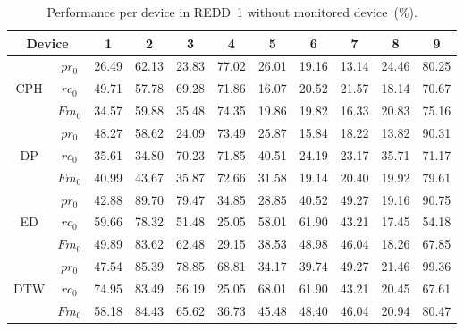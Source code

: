 \begin{table}
\caption{Performance per device in REDD~1 without monitored device~($\%$).}\label{table:SR6a}
\begin{center}
\begin{tabular}{|c|c|c|c|c|c|c|c|c|c|c|}
\hline
\multicolumn{2}{|c|}{Device}& 1&2&3&4&5&6&7&8&9\\
\hline
\multirow{3}{*}{CPH} & $pr_0$ &26.49&62.13&23.83&77.02&26.01&19.16&13.14&24.46&80.25 \\
& $rc_0$ &49.71&57.78&69.28&71.86&16.07&20.52&21.57&18.14&70.67 \\
& $Fm_0$ & 34.57&59.88&35.48&74.35&19.86&19.82&16.33&20.83&75.16\\
\hline
\multirow{3}{*}{DP} & $pr_0$ & 48.27&58.62&24.09&73.49&25.87&15.84&18.22&13.82&90.31 \\
& $rc_0$ & 35.61&34.80&70.23&71.85&40.51&24.19&23.17&35.71&71.17 \\
& $Fm_0$ &40.99&43.67&35.87&72.66&31.58&19.14&20.40&19.92&79.61 \\
\hline
\multirow{3}{*}{ED} & $pr_0$ & 42.88&89.70&79.47&34.85&28.85&40.52&49.27&19.16&90.75\\
& $rc_0$ &59.66&78.32&51.48&25.05&58.01&61.90&43.21&17.45&54.18  \\
& $Fm_0$ &49.89&83.62&62.48&29.15&38.53&48.98&46.04&18.26&67.85 \\
\hline
\multirow{3}{*}{DTW} & $pr_0$ &47.54 &85.39 &78.85 &68.81 &34.17 &39.74 &49.27 &21.46 &99.36 \\
& $rc_0$ &74.95 &83.49 &56.19 &25.05 &68.01 &61.90 &43.21 &20.45 &67.61  \\
& $Fm_0$ &58.18 &84.43 &65.62 &36.73 &45.48 &48.40 &46.04 &20.94 &80.47 \\
\hline
\end{tabular}
\end{center}
\end{table}

